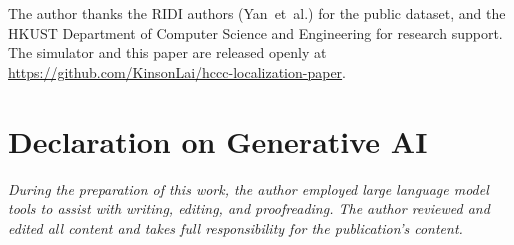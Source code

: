 \documentclass{ceurart}
\theoremstyle{definition}
\begin{document}
\begin{acknowledgments}
The author thanks the RIDI authors (Yan~et~al.) for the public dataset, and the HKUST
Department of Computer Science and Engineering for research support. The simulator and
this paper are released openly at
\url{https://github.com/KinsonLai/hccc-localization-paper}.
\end{acknowledgments}

\section*{Declaration on Generative AI}
\emph{During the preparation of this work, the author employed large language model
tools to assist with writing, editing, and proofreading. The author reviewed and
edited all content and takes full responsibility for the publication's content.}


\end{document}
